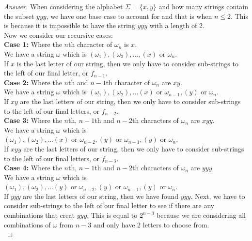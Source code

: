 \documentclass[11pt]{article}
\theoremstyle{definition}
\theoremstyle{definition}
\theoremstyle{definition}
\begin{document}
\begin{proof}[Answer]
When considering the alphabet $\Sigma = \{x, y\}$ and how many strings contain the subset $yyy$, we have one base case to account for and that is when $n \leq 2$. This is because it is impossible to have the string $yyy$ with a length of 2. \\

Now we consider our recursive cases:\\
\textbf{Case 1:} Where the $n$th character of $\omega_n$ is $x$.\\

We have a string $\omega$ which is $(\omega_1), (\omega_2), ..., (x)\text{ or $\omega_n$}$.\\ 
If $x$ is the last letter of our string, then we only have to consider sub-strings to the left of our final letter, or $f_{n-1}$.\\

\textbf{Case 2:} Where the $n$th and $n-1$th character of $\omega_n$ are $xy$.\\

We have a string $\omega$ which is $(\omega_1), (\omega_2), ...(x)\text{ or $\omega_{n-1}$}, (y)\text{ or $\omega_n$}$.\\ 
If $xy$ are the last letters of our string, then we only have to consider sub-strings to the left of our final letters, or $f_{n-2}$.\\

\textbf{Case 3:} Where the $n$th, $n-1$th and $n - 2$th characters of $\omega_n$ are $xyy$.\\

We have a string $\omega$ which is $(\omega_1), (\omega_2), ...(x)\text{ or $\omega_{n-2}$}, (y)\text{ or $\omega_{n-1}$}, (y)\text{ or $\omega_n$}$.\\ 
If $xyy$ are the last letters of our string, then we only have to consider sub-strings to the left of our final letters, or $f_{n-3}$.\\

\textbf{Case 4:} Where the $n$th, $n-1$th and $n - 2$th characters of $\omega_n$ are $yyy$.\\

We have a string $\omega$ which is $(\omega_1), (\omega_2), ...(y)\text{ or $\omega_{n-2}$}, (y)\text{ or $\omega_{n-1}$}, (y)\text{ or $\omega_n$}$.\\ 
If $yyy$ are the last letters of our string, then we have found $yyy$. Next, we have to consider sub-strings to the left of our final letter to see if there are any combinations that creat $yyy$. This is equal to $2^{n-3}$ because we are considering all combinations of $\omega$ from $n-3$ and only have 2 letters to choose from.\\


\end{proof}
\end{document}
